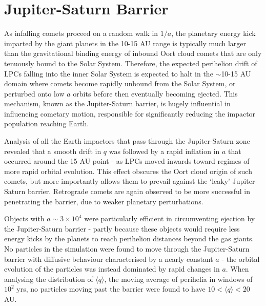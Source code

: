 

\section{Jupiter-Saturn Barrier}
\label{js-barrier}
As infalling comets proceed on a random walk in $1/a$, the planetary energy kick imparted by the giant planets in the 10-15 AU range is typically much larger than the gravitational binding energy of inbound Oort cloud comets that are only tenuously bound to the Solar System. Therefore, the expected perihelion drift of LPCs falling into the inner Solar System is expected to halt in the $\sim$10-15 AU domain where comets become rapidly unbound from the Solar System, or perturbed onto low $a$ orbits before then eventually becoming ejected. This mechanism, known as the Jupiter-Saturn barrier, is hugely influential in influencing cometary motion, responsible for significantly reducing the impactor population reaching Earth.

Analysis of all the Earth impactors that pass through the Jupiter-Saturn zone revealed that a smooth drift in $q$ was followed by a rapid inflation in $a$ that occurred around the 15 AU point - as LPCs moved inwards toward regimes of more rapid orbital evolution. This effect obscures the Oort cloud origin of such comets, but more importantly allows them to prevail against the `leaky' Jupiter-Saturn barrier. Retrograde comets are again observed to be more successful in penetrating the barrier, due to weaker planetary perturbations.

Objects with $a\sim 3\times10^4$ were particularly efficient in circumventing ejection by the Jupiter-Saturn barrier - partly because these objects would require less energy kicks by the planets to reach perihelion distances beyond the gas giants. No particles in the simulation were found to move through the Jupiter-Saturn barrier with diffusive behaviour characterised by a nearly constant $a$ - the orbital evolution of the particles was instead dominated by rapid changes in $a$. When analysing the distribution of $\langle q \rangle$, the moving average of perihelia in windows of $10^2$ yrs, no particles moving past the barrier were found to have $10 < \langle q \rangle < 20$ AU.

